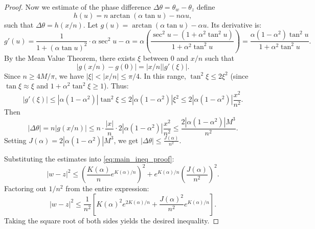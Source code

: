 \documentclass[10pt,a4paper]{amsart}
\begin{document}
\begin{proof}
\medskip
Now we estimate of the phase difference $\Delta \theta = \theta_w - \theta_z$
define
$$h(u) = n \arctan(\alpha \tan u) - n \alpha u,
$$
 such that $\Delta \theta = h(x/n)$. Let $g(u) = \arctan(\alpha \tan u) - \alpha u$. Its derivative is:
\[
    g'(u) = \frac{1}{1 + (\alpha \tan u)^2} \cdot \alpha \sec^2 u - \alpha = \alpha \left( \frac{\sec^2 u - (1 + \alpha^2 \tan^2 u)}{1 + \alpha^2 \tan^2 u} \right) = \frac{\alpha(1-\alpha^2)\tan^2 u}{1+\alpha^2 \tan^2 u}.
\]
By the Mean Value Theorem, there exists $\xi$ between $0$ and $x/n$ such that
$$|g(x/n) - g(0)| = |x/n| |g'(\xi)|.
$$
 Since $n \ge 4M/\pi$, we have $|\xi| < |x/n| \le \pi/4$. In this range, $\tan^2 \xi \le 2\xi^2$ (since $\tan \xi \approx \xi$ and $1+\alpha^2 \tan^2 \xi \ge 1$). Thus:
\[
    |g'(\xi)| \leq |\alpha(1-\alpha^2)| \tan^2 \xi \leq 2 |\alpha(1-\alpha^2)| \xi^2 \leq 2 |\alpha(1-\alpha^2)| \frac{x^2}{n^2}.
\]
Then
$$|\Delta \theta| = n |g(x/n)| \leq n \cdot \frac{|x|}{n} \cdot 2 |\alpha(1-\alpha^2)| \frac{x^2}{n^2} \leq \frac{2 |\alpha(1-\alpha^2)| M^3}{n^2}.
$$
Setting $J(\alpha) = 2|\alpha(1-\alpha^2)|M^3$, we get $|\Delta \theta| \leq \frac{J(\alpha)}{n^2}$.

\medskip
Substituting the estimates into \eqref{eq:main_ineq_proof}:
\[
    |w-z|^2 \leq \left( \frac{K(\alpha)}{n} e^{K(\alpha)/n} \right)^2 + e^{K(\alpha)/n} \left( \frac{J(\alpha)}{n^2} \right)^2.
\]
Factoring out $1/n^2$ from the entire expression:
\[
    |w-z|^2 \leq \frac{1}{n^2} \left[ K(\alpha)^2 e^{2K(\alpha)/n} + \frac{J(\alpha)^2}{n^2} e^{K(\alpha)/n} \right].
\]
Taking the square root of both sides yields the desired inequality.
\end{proof}
\end{document}
